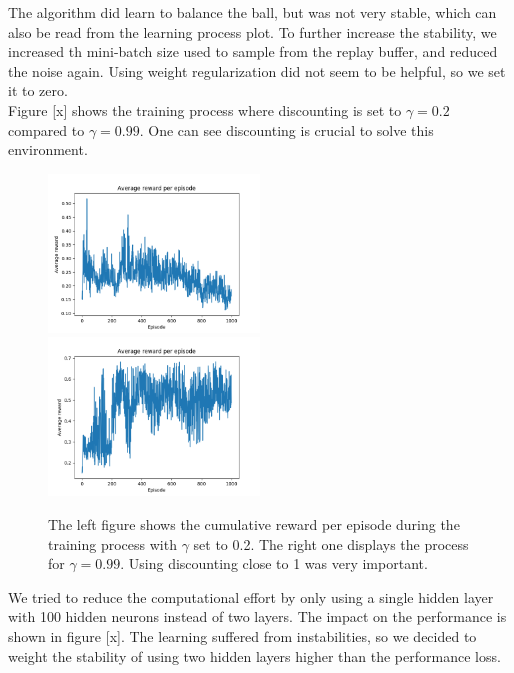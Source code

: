 The algorithm did learn to balance the ball, but was not very stable, which can also be read from the learning process plot. To further increase the stability, we increased th mini-batch size used to sample from the replay buffer, and reduced the noise again. Using weight regularization did not seem to be helpful, so we set it to zero.\\
Figure [x] shows the training process where discounting is set to $\gamma=0.2$ compared to $\gamma=0.99$. One can see discounting is crucial to solve this environment.\\
\begin{figure}[H]
	\includegraphics[width=0.5\textwidth]{plots/ddpg_ball_low_gamma.png}
	\includegraphics[width=0.5\textwidth]{plots/ddpg_ball_high_gamma.png}
	\caption{The left figure shows the cumulative reward per episode during the training process with $\gamma$ set to 0.2. The right one displays the process for $\gamma=0.99$. Using discounting close to 1 was very important.}
	\label{ddpg:ball:gamma}
\end{figure}
We tried to reduce the computational effort by only using a single hidden layer with 100 hidden neurons instead of two layers. The impact on the performance is shown in figure [x]. The learning suffered from instabilities, so we decided to weight the stability of using two hidden layers higher than the performance loss.
